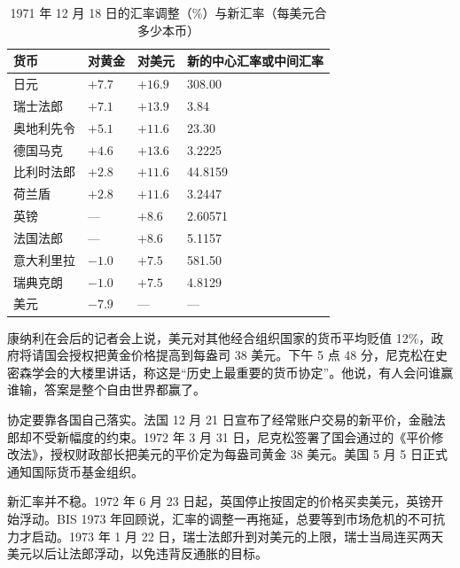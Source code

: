 \begin{table}[tbp]\centering\small
\caption{1971 年 12 月 18 日的汇率调整（\%）与新汇率（每美元合多少本币）}\label{tab:floating-smithsonian}
\begin{tabularx}{\linewidth}{@{}lYYY@{}}
\toprule
货币 & 对黄金 & 对美元 & 新的中心汇率或中间汇率\\
\midrule
日元 & $+7.7$ & $+16.9$ & 308.00\\
瑞士法郎 & $+7.1$ & $+13.9$ & 3.84\\
奥地利先令 & $+5.1$ & $+11.6$ & 23.30\\
德国马克 & $+4.6$ & $+13.6$ & 3.2225\\
比利时法郎 & $+2.8$ & $+11.6$ & 44.8159\\
荷兰盾 & $+2.8$ & $+11.6$ & 3.2447\\
英镑 & — & $+8.6$ & 2.60571\\
法国法郎 & — & $+8.6$ & 5.1157\\
意大利里拉 & $-1.0$ & $+7.5$ & 581.50\\
瑞典克朗 & $-1.0$ & $+7.5$ & 4.8129\\
美元 & $-7.9$ & — & —\\
\bottomrule
\end{tabularx}
\end{table}

康纳利在会后的记者会上说，美元对其他经合组织国家的货币平均贬值 12\%，政府将请国会授权把黄金价格提高到每盎司 38 美元\cite{frus46a}。下午 5 点 48 分，尼克松在史密森学会的大楼里讲话，称这是“历史上最重要的货币协定”\cite{nixon1971b}。他说，有人会问谁赢谁输，答案是整个自由世界都赢了\cite{nixon1971b}。

协定要靠各国自己落实。法国 12 月 21 日宣布了经常账户交易的新平价，金融法郎却不受新幅度的约束\cite{frus46a}。1972 年 3 月 31 日，尼克松签署了国会通过的《平价修改法》，授权财政部长把美元的平价定为每盎司黄金 38 美元\cite{pvma1972}。美国 5 月 5 日正式通知国际货币基金组织\cite{bis1972}。

新汇率并不稳。1972 年 6 月 23 日起，英国停止按固定的价格买卖美元，英镑开始浮动\cite{bis1973}。BIS 1973 年回顾说，汇率的调整一再拖延，总要等到市场危机的不可抗力才启动\cite{bis1973}。1973 年 1 月 22 日，瑞士法郎升到对美元的上限，瑞士当局连买两天美元以后让法郎浮动，以免违背反通胀的目标\cite{bis1973}。

